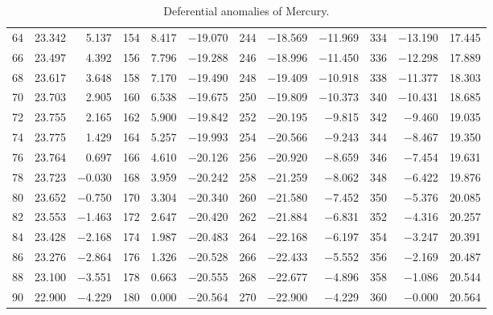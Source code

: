 \begin{table}[!h]
{\begin{tabular}{rrr|rrr|rrr|rrr}
 64 &  23.342 &  5.137 & 154 &   8.417 & $-$19.070 & 244 & $-$18.569 & $-$11.969 & 334 & $-$13.190 & 17.445\\
 66 &  23.497 &  4.392 & 156 &   7.796 & $-$19.288 & 246 & $-$18.996 & $-$11.450 & 336 & $-$12.298 & 17.889\\
 68 &  23.617 &  3.648 & 158 &   7.170 & $-$19.490 & 248 & $-$19.409 & $-$10.918 & 338 & $-$11.377 & 18.303\\
 70 &  23.703 &  2.905 & 160 &   6.538 & $-$19.675 & 250 & $-$19.809 & $-$10.373 & 340 & $-$10.431 & 18.685\\
 72 &  23.755 &  2.165 & 162 &   5.900 & $-$19.842 & 252 & $-$20.195 & $-$9.815 & 342 &  $-$9.460 & 19.035\\
 74 &  23.775 &  1.429 & 164 &   5.257 & $-$19.993 & 254 & $-$20.566 & $-$9.243 & 344 &  $-$8.467 & 19.350\\
 76 &  23.764 &  0.697 & 166 &   4.610 & $-$20.126 & 256 & $-$20.920 & $-$8.659 & 346 &  $-$7.454 & 19.631\\
 78 &  23.723 & $-$0.030 & 168 &   3.959 & $-$20.242 & 258 & $-$21.259 & $-$8.062 & 348 &  $-$6.422 & 19.876\\
 80 &  23.652 & $-$0.750 & 170 &   3.304 & $-$20.340 & 260 & $-$21.580 & $-$7.452 & 350 &  $-$5.376 & 20.085\\
 82 &  23.553 & $-$1.463 & 172 &   2.647 & $-$20.420 & 262 & $-$21.884 & $-$6.831 & 352 &  $-$4.316 & 20.257\\
 84 &  23.428 & $-$2.168 & 174 &   1.987 & $-$20.483 & 264 & $-$22.168 & $-$6.197 & 354 &  $-$3.247 & 20.391\\
 86 &  23.276 & $-$2.864 & 176 &   1.326 & $-$20.528 & 266 & $-$22.433 & $-$5.552 & 356 &  $-$2.169 & 20.487\\
 88 &  23.100 & $-$3.551 & 178 &   0.663 & $-$20.555 & 268 & $-$22.677 & $-$4.896 & 358 &  $-$1.086 & 20.544\\
 90 &  22.900 & $-$4.229 & 180 &   0.000 & $-$20.564 & 270 & $-$22.900 & $-$4.229 & 360 &  $-$0.000 & 20.564\\
\end{tabular}}
\caption{Deferential anomalies of Mercury.}\label{vt21}
\end{table}

